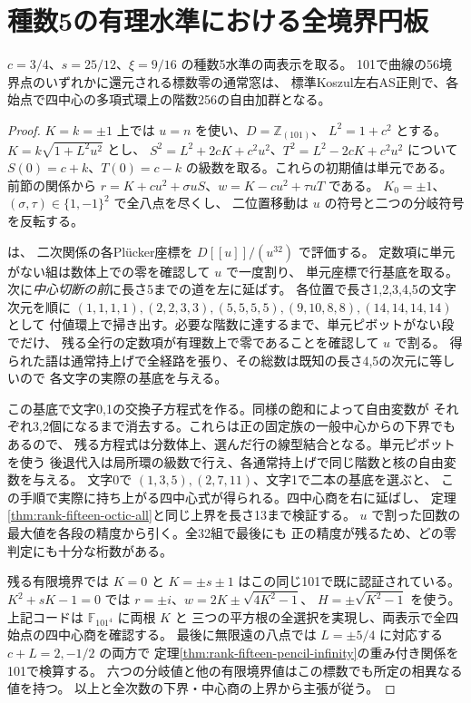 \section{種数5の有理水準における全境界円板}
\label{sec:rank-fifteen-pencil-trace-disks}
\begin{theorem}\label{thm:rank-fifteen-pencil-trace-disks}
$c=3/4$、$s=25/12$、$\xi=9/16$ の種数5水準の両表示を取る。
101で曲線の56境界点のいずれかに還元される標数零の通常窓は、
標準Koszul左右AS正則で、各始点で四中心の多項式環上の階数256の自由加群となる。
\end{theorem}
\begin{proof}
$K=k=\pm1$ 上では $u=n$ を使い、$D=\mathbb Z_{(101)}$、
$L^2=1+c^2$ とする。$K=k\sqrt{1+L^2u^2}$ とし、
$S^2=L^2+2cK+c^2u^2$、$T^2=L^2-2cK+c^2u^2$ について
$S(0)=c+k$、$T(0)=c-k$ の級数を取る。これらの初期値は単元である。
前節の関係から $r=K+cu^2+\sigma uS$、$w=K-cu^2+\tau uT$ である。
$K_0=\pm1$、$(\sigma,\tau)\in\{1,-1\}^2$ で全八点を尽くし、
二位置移動は $u$ の符号と二つの分岐符号を反転する。

 は、
二次関係の各Pl\"ucker座標を $D[[u]]/(u^{32})$ で評価する。
定数項に単元がない組は数体上での零を確認して $u$ で一度割り、
単元座標で行基底を取る。次に\emph{中心切断の前}に長さ5までの道を左に延ばす。
各位置で長さ1,2,3,4,5の文字次元を順に
$(1,1,1,1),(2,2,3,3),(5,5,5,5),(9,10,8,8),(14,14,14,14)$ として
付値環上で掃き出す。必要な階数に達するまで、単元ピボットがない段でだけ、
残る全行の定数項が有理数上で零であることを確認して $u$ で割る。
得られた語は通常持上げで全経路を張り、その総数は既知の長さ4,5の次元に等しいので
各文字の実際の基底を与える。

この基底で文字0,1の交換子方程式を作る。同様の飽和によって自由変数が
それぞれ3,2個になるまで消去する。これらは正の固定族の一般中心からの下界でもあるので、
残る方程式は分数体上、選んだ行の線型結合となる。単元ピボットを使う
後退代入は局所環の級数で行え、各通常持上げで同じ階数と核の自由変数を与える。
文字0で $(1,3,5),(2,7,11)$、文字1で二本の基底を選ぶと、
この手順で実際に持ち上がる四中心式が得られる。四中心商を右に延ばし、
定理\ref{thm:rank-fifteen-octic-all}と同じ上界を長さ13まで検証する。
$u$ で割った回数の最大値を各段の精度から引く。全32組で最後にも
正の精度が残るため、どの零判定にも十分な桁数がある。

残る有限境界では $K=0$ と $K=\pm s\pm1$ はこの同じ101で既に認証されている。
$K^2+sK-1=0$ では $r=\pm i$、$w=2K\pm\sqrt{4K^2-1}$、
$H=\pm\sqrt{K^2-1}$ を使う。上記コードは $\mathbb F_{101^4}$ に両根 $K$ と
三つの平方根の全選択を実現し、両表示で全四始点の四中心商を確認する。
最後に無限遠の八点では $L=\pm5/4$ に対応する $c+L=2,-1/2$ の両方で
定理\ref{thm:rank-fifteen-pencil-infinity}の重み付き関係を101で検算する。
六つの分岐値と他の有限境界値はこの標数でも所定の相異なる値を持つ。
以上と全次数の下界・中心商の上界から主張が従う。
\end{proof}

